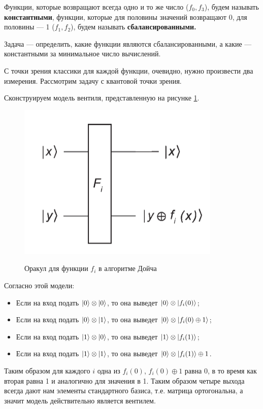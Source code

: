 \documentclass[a4paper, 12pt]{article}
\begin{document}
Функции, которые возвращают всегда одно и то же число ($f_0, f_3$), будем называть \textbf{константными}, функции, которые для половины значений возвращают 0, для половины --- 1 ($f_1, f_2$), будем называть \textbf{сбалансированными.}

Задача --- определить, какие функции являются сбалансированными, а какие --- константными за минимальное число вычислений.

С точки зрения классики для каждой функции, очевидно, нужно произвести два измерения. Рассмотрим задачу с квантовой точки зрения.

Сконструируем модель вентиля, представленную на рисунке \ref{DoiceF}.

\begin{figure}[H]
	\centering
	\includegraphics[width=0.6\linewidth]{DoiceF}
	\label{DoiceF}
	\caption{Оракул для функции $f_i$ в алгоритме Дойча}
\end{figure}

Согласно этой модели:

\begin{itemize}
	\item Если на вход подать $\ket{0} \otimes \ket{0}$, то она выведет $\ket{0} \otimes \ket{f_i(0)}$;
	
	\item Если на вход подать $\ket{0} \otimes \ket{1}$, то она выведет $\ket{0} \otimes \ket{f_i(0) \oplus 1}$;
	
	\item Если на вход подать $\ket{1} \otimes \ket{0}$, то она выведет $\ket{1} \otimes \ket{f_i(1)}$;
	
	\item Если на вход подать $\ket{1} \otimes \ket{1}$, то она выведет $\ket{0} \otimes \ket{f_i(1)}\oplus 1$.
\end{itemize}

Таким образом для каждого $i$ одна из $f_i(0)$, $f_i(0) \oplus 1$ равна 0, в то время как вторая равна 1 и аналогично для значения в 1. Таким образом четыре выхода всегда дают нам элементы стандартного базиса, т.е. матрица ортогональна, а значит модель действительно является вентилем.
\end{document}
